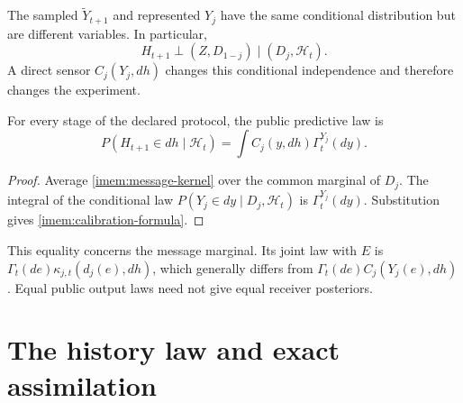 The sampled $\widetilde Y_{t+1}$ and represented $Y_j$ have the same conditional distribution but are different variables. In particular,
\begin{equation}
 H_{t+1}\mathbin{\perp}(Z,D_{1-j})\mid(D_j,\mathcal H_t).
 \label{imem:conditional-independence}
\end{equation}
A direct sensor $C_j(Y_j,dh)$ changes this conditional independence and therefore changes the experiment.

For every stage of the declared protocol, the public predictive law is
\begin{equation}
 P(H_{t+1}\in dh\mid\mathcal H_t)
 =\int C_j(y,dh)\Gamma_t^{Y_j}(dy).
 \label{imem:calibration-formula}
\end{equation}
\begin{proof}
Average \cref{imem:message-kernel} over the common marginal of $D_j$. The integral of the conditional law $P(Y_j\in dy\mid D_j,\mathcal H_t)$ is $\Gamma_t^{Y_j}(dy)$. Substitution gives \cref{imem:calibration-formula}.
\end{proof}
This equality concerns the message marginal. Its joint law with $E$ is $\Gamma_t(de)\kappa_{j,t}(d_j(e),dh)$, which generally differs from $\Gamma_t(de)C_j(Y_j(e),dh)$. Equal public output laws need not give equal receiver posteriors.

\section{The history law and exact assimilation}

